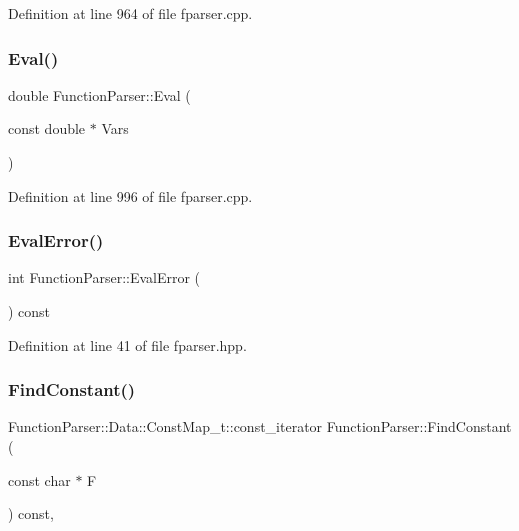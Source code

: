 Definition at line 964 of file fparser.\+cpp.

\mbox{\label{class_function_parser_a8fe3538f4cd207346c390059ba334023}} 
\subsubsection{\texorpdfstring{Eval()}{Eval()}}
{\footnotesize\ttfamily double Function\+Parser\+::\+Eval (\begin{DoxyParamCaption}\item[{const double $\ast$}]{Vars }\end{DoxyParamCaption})}



Definition at line 996 of file fparser.\+cpp.

\mbox{\label{class_function_parser_a94faf9f4616d0850821cce15abbcf421}} 
\subsubsection{\texorpdfstring{Eval\+Error()}{EvalError()}}
{\footnotesize\ttfamily int Function\+Parser\+::\+Eval\+Error (\begin{DoxyParamCaption}{ }\end{DoxyParamCaption}) const\hspace{0.3cm}{\ttfamily [inline]}}



Definition at line 41 of file fparser.\+hpp.

\mbox{\label{class_function_parser_a305fdcea81a498567dc92010338cee7c}} 
\subsubsection{\texorpdfstring{Find\+Constant()}{FindConstant()}}
{\footnotesize\ttfamily Function\+Parser\+::\+Data\+::\+Const\+Map\+\_\+t\+::const\+\_\+iterator Function\+Parser\+::\+Find\+Constant (\begin{DoxyParamCaption}\item[{const char $\ast$}]{F }\end{DoxyParamCaption}) const\hspace{0.3cm}{\ttfamily [inline]}, {\ttfamily [private]}}



